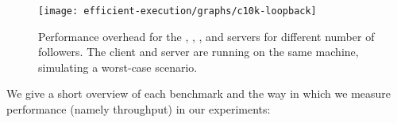 

\begin{figure}[!t]
 \centering
 \texttt{[image: efficient-execution/graphs/c10k-loopback]}
 \caption{Performance overhead for the \beanstalkd, \lighttpd, \memcached, \nginx
   and \redis servers for different number of followers.  The client
   and server are running on the same machine, simulating a worst-case scenario.}
   \label{fig:servers}
\end{figure}


We give a short overview of each benchmark and the way in which we
measure performance (namely throughput) in our experiments:

